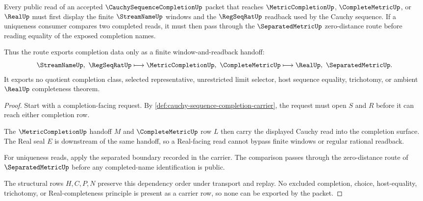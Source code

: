 \begin{theorem}
\label{thm:cauchy-sequence-completion-finite-window-route}
Every public read of an accepted $\CauchySequenceCompletionUp$ packet that reaches $\MetricCompletionUp$, $\CompleteMetricUp$, or $\RealUp$ must first display the finite $\StreamNameUp$ windows and the $\RegSeqRatUp$ readback used by the Cauchy sequence. If a uniqueness consumer compares two completed reads, it must then pass through the $\SeparatedMetricUp$ zero-distance route before reading equality of the exposed completion names.

Thus the route exports completion data only as a finite window-and-readback handoff:
$$
\StreamNameUp,\ \RegSeqRatUp \longmapsto \MetricCompletionUp,\ \CompleteMetricUp \longmapsto \RealUp,\ \SeparatedMetricUp .
$$
It exports no quotient completion class, selected representative, unrestricted limit selector, host sequence equality, trichotomy, or ambient $\RealUp$ completeness theorem.
\end{theorem}
\begin{proof}
Start with a completion-facing request. By \autoref{def:cauchy-sequence-completion-carrier}, the request must open $S$ and $R$ before it can reach either completion row.

The $\MetricCompletionUp$ handoff $M$ and $\CompleteMetricUp$ row $L$ then carry the displayed Cauchy read into the completion surface. The Real seal $E$ is downstream of the same handoff, so a Real-facing read cannot bypass finite windows or regular rational readback.

For uniqueness reads, apply the separated boundary recorded in the carrier. The comparison passes through the zero-distance route of $\SeparatedMetricUp$ before any completed-name identification is public.

The structural rows $H,C,P,N$ preserve this dependency order under transport and replay. No excluded completion, choice, host-equality, trichotomy, or Real-completeness principle is present as a carrier row, so none can be exported by the packet.
\end{proof}


